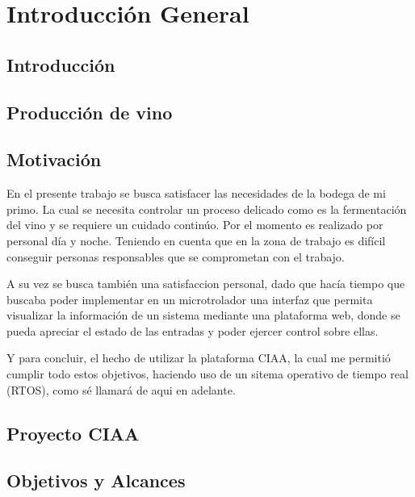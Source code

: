 
\chapter{Introducción General} %

\label{Chapter1} %
\label{IntroGeneral}


\newcommand{\keyword}[1]{\textbf{#1}}
\newcommand{\tabhead}[1]{\textbf{#1}}
\newcommand{\code}[1]{\texttt{#1}}
\newcommand{\file}[1]{\texttt{\bfseries#1}}
\newcommand{\option}[1]{\texttt{\itshape#1}}
\newcommand{\grados}{$^{\circ}$}


\section{Introducción}


\section{Producción de vino}


\section{Motivación}

En el presente trabajo se busca satisfacer las necesidades de la bodega de mi primo. La cual se necesita controlar un proceso delicado como es la fermentación del vino y se requiere un cuidado continúo. Por el momento es realizado por personal día y noche. Teniendo en cuenta que en la zona de trabajo es difícil conseguir personas responsables que se comprometan con el trabajo. 

A su vez se busca también una satisfaccion personal, dado que hacía tiempo que buscaba poder implementar en un microtrolador una interfaz que permita visualizar la información de un sistema mediante una plataforma web, donde se pueda apreciar el estado de las entradas y poder ejercer control sobre ellas.

Y para concluir, el hecho de utilizar la plataforma CIAA, la cual me permitió cumplir todo estos objetivos, haciendo uso de un sitema operativo de tiempo real (RTOS), como sé llamará de aqui en adelante.



\section{Proyecto CIAA}

\section{Objetivos y Alcances}





